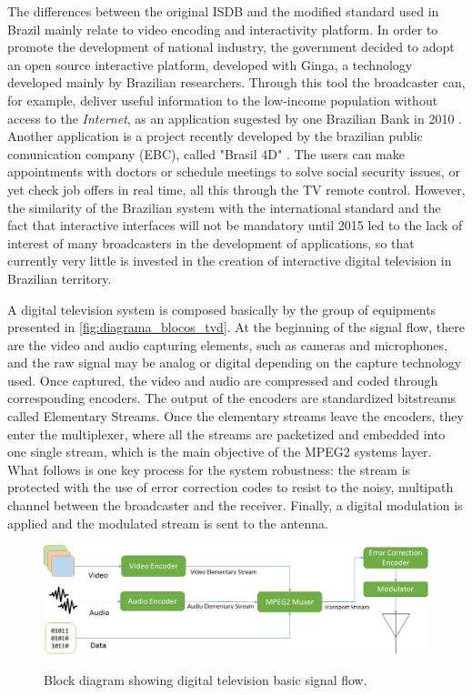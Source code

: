 \documentclass[
	12pt,				%
	openright,			%
	twoside,			%
	a4paper,			%
	brazil,
	french,				%
	english
	]{abntex2}
\begin{document}
The differences between the original ISDB and the modified standard used in Brazil mainly relate to video encoding and interactivity platform. In order to promote the development of national industry, the government decided to adopt an open source interactive platform, developed with Ginga, a technology developed mainly by Brazilian researchers\cite{PUCRJ}. Through this tool the broadcaster can, for example, deliver useful information to the low-income population without access to the \textit{Internet}, as an application sugested by one Brazilian Bank in 2010 \cite{caixa}. Another application is a project recently developed by the brazilian public comunication company (EBC), called "Brasil 4D" \cite{consultas}. The users can make appointments with doctors or schedule meetings to solve social security issues, or yet check job offers in real time, all this through the TV remote control. However, the similarity of the Brazilian system with the international standard and the fact that interactive interfaces will not be mandatory until 2015 led to the lack of interest of many broadcasters in the development of applications, so that currently very little is invested in the creation of interactive digital television in Brazilian territory.

A digital television system is composed basically by the group of equipments presented in \autoref{fig:diagrama_blocos_tvd}. At the beginning of the signal flow, there are the video and audio capturing elements, such as cameras and microphones, and the raw signal may be analog or digital depending on the capture technology used. Once captured, the video and audio are compressed and coded through corresponding encoders. The output of the encoders are standardized bitstreams called Elementary Streams. Once the elementary streams leave the encoders, they enter the multiplexer, where all the streams are packetized and embedded into one single stream, which is the main objective of the MPEG2 systems layer. What follows is one key process for the system robustness: the stream is protected with the use of error correction codes to resist to the noisy, multipath channel between the broadcaster and the receiver. Finally, a digital modulation is applied and the modulated stream is sent to the antenna.
 
 \begin{figure}[!h]
\centering
\caption{Block diagram showing digital television basic signal flow.}
\includegraphics[width=1\linewidth]{figuras/diagrama_blocos_tvd.png}
\label{fig:diagrama_blocos_tvd}
\end{figure}
 
\end{document}
